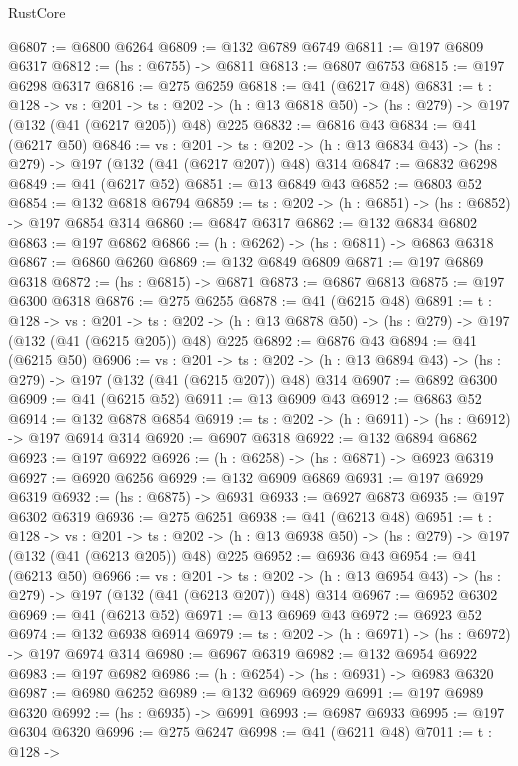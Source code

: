 \begin{lexlean}{RustCore}
\begin{coremodule}
@6807 := @6800 @6264
@6809 := @132 @6789 @6749
@6811 := @197 @6809 @6317
@6812 := (hs : @6755) -> @6811
@6813 := @6807 @6753
@6815 := @197 @6298 @6317
@6816 := @275 @6259
@6818 := @41 (@6217 @48)
@6831 := {t : @128} ->
  {vs : @201} ->
  {ts : @202} -> (h : @13 @6818 @50) -> (hs : @279) -> @197 (@132 (@41 (@6217 @205)) @48) @225
@6832 := @6816 @43
@6834 := @41 (@6217 @50)
@6846 := {vs : @201} ->
  {ts : @202} -> (h : @13 @6834 @43) -> (hs : @279) -> @197 (@132 (@41 (@6217 @207)) @48) @314
@6847 := @6832 @6298
@6849 := @41 (@6217 @52)
@6851 := @13 @6849 @43
@6852 := @6803 @52
@6854 := @132 @6818 @6794
@6859 := {ts : @202} -> (h : @6851) -> (hs : @6852) -> @197 @6854 @314
@6860 := @6847 @6317
@6862 := @132 @6834 @6802
@6863 := @197 @6862
@6866 := (h : @6262) -> (hs : @6811) -> @6863 @6318
@6867 := @6860 @6260
@6869 := @132 @6849 @6809
@6871 := @197 @6869 @6318
@6872 := (hs : @6815) -> @6871
@6873 := @6867 @6813
@6875 := @197 @6300 @6318
@6876 := @275 @6255
@6878 := @41 (@6215 @48)
@6891 := {t : @128} ->
  {vs : @201} ->
  {ts : @202} -> (h : @13 @6878 @50) -> (hs : @279) -> @197 (@132 (@41 (@6215 @205)) @48) @225
@6892 := @6876 @43
@6894 := @41 (@6215 @50)
@6906 := {vs : @201} ->
  {ts : @202} -> (h : @13 @6894 @43) -> (hs : @279) -> @197 (@132 (@41 (@6215 @207)) @48) @314
@6907 := @6892 @6300
@6909 := @41 (@6215 @52)
@6911 := @13 @6909 @43
@6912 := @6863 @52
@6914 := @132 @6878 @6854
@6919 := {ts : @202} -> (h : @6911) -> (hs : @6912) -> @197 @6914 @314
@6920 := @6907 @6318
@6922 := @132 @6894 @6862
@6923 := @197 @6922
@6926 := (h : @6258) -> (hs : @6871) -> @6923 @6319
@6927 := @6920 @6256
@6929 := @132 @6909 @6869
@6931 := @197 @6929 @6319
@6932 := (hs : @6875) -> @6931
@6933 := @6927 @6873
@6935 := @197 @6302 @6319
@6936 := @275 @6251
@6938 := @41 (@6213 @48)
@6951 := {t : @128} ->
  {vs : @201} ->
  {ts : @202} -> (h : @13 @6938 @50) -> (hs : @279) -> @197 (@132 (@41 (@6213 @205)) @48) @225
@6952 := @6936 @43
@6954 := @41 (@6213 @50)
@6966 := {vs : @201} ->
  {ts : @202} -> (h : @13 @6954 @43) -> (hs : @279) -> @197 (@132 (@41 (@6213 @207)) @48) @314
@6967 := @6952 @6302
@6969 := @41 (@6213 @52)
@6971 := @13 @6969 @43
@6972 := @6923 @52
@6974 := @132 @6938 @6914
@6979 := {ts : @202} -> (h : @6971) -> (hs : @6972) -> @197 @6974 @314
@6980 := @6967 @6319
@6982 := @132 @6954 @6922
@6983 := @197 @6982
@6986 := (h : @6254) -> (hs : @6931) -> @6983 @6320
@6987 := @6980 @6252
@6989 := @132 @6969 @6929
@6991 := @197 @6989 @6320
@6992 := (hs : @6935) -> @6991
@6993 := @6987 @6933
@6995 := @197 @6304 @6320
@6996 := @275 @6247
@6998 := @41 (@6211 @48)
@7011 := {t : @128} ->

\end{coremodule}
\end{lexlean}
